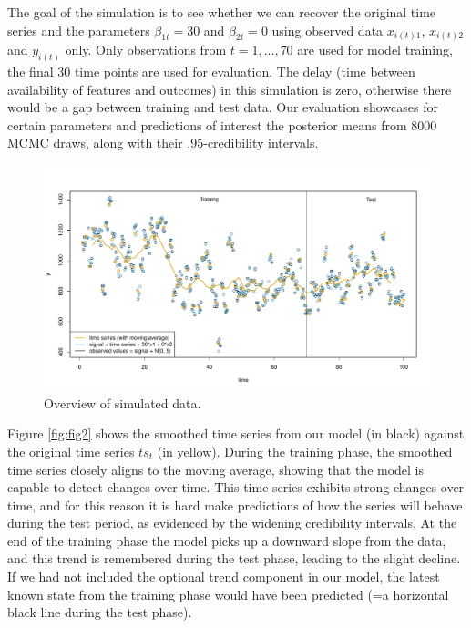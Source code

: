 \documentclass{article}
\begin{document}
The goal of the simulation is to see whether we can recover the original time series and the parameters $\beta_{1t} = 30$ and $\beta_{2t} = 0$ using observed data $x_{i(t)1}$, $x_{i(t)2}$ and $y_{i(t)}$ only. Only observations from $t = 1, ..., 70$ are used for model training, the final 30 time points are used for evaluation. The delay (time between availability of features and outcomes) in this simulation is zero, otherwise there would be a gap between training and test data. Our evaluation showcases for certain parameters and predictions of interest the posterior means from 8000 MCMC draws, along with their .95-credibility intervals.

\begin{figure}
	\centering
	\includegraphics[width=630pt, angle=270]{visualize_simulated_data.pdf}
	\caption{Overview of simulated data.}
	\label{fig:fig1}
\end{figure}

Figure \ref{fig:fig2} shows the smoothed time series from our model (in black) against the original time series $ts_t$ (in yellow). During the training phase, the smoothed time series closely aligns to the moving average, showing that the model is capable to detect changes over time. This time series exhibits strong changes over time, and for this reason it is hard make predictions of how the series will behave during the test period, as evidenced by the widening credibility intervals. At the end of the training phase the model picks up a downward slope from the data, and this trend is remembered during the test phase, leading to the slight decline. If we had not included the optional trend component in our model, the latest known state from the training phase would have been predicted (=a horizontal black line during the test phase).
\end{document}
